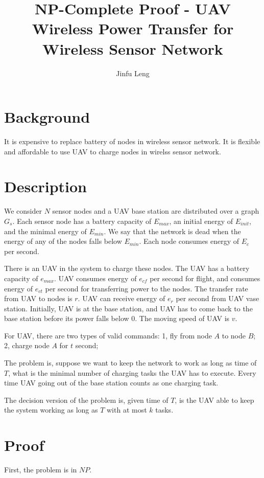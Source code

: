 
\title{NP-Complete Proof - UAV Wireless Power Transfer for Wireless Sensor Network}
\author{Jinfu Leng}
\maketitle
\section{Background}
It is expensive to replace battery of nodes in wireless sensor network.
It is flexible and affordable to use UAV to charge nodes in wirelss sensor network.
\section{Description}
We consider $N$ sensor nodes and a UAV base station are distributed over a graph $G_s$. Each sensor node has a battery capacity of $E_{max}$, an initial energy of $E_{init}$, and the minimal energy of $E_{min}$. We say that the network is dead when the energy of any of the nodes falls below $E_{min}$. Each node consumes energy of $E_{c}$ per second.

There is an UAV in the system to charge these nodes. The UAV has a battery capacity of $e_{max}$. UAV consumes energy of $e_{cf}$ per second for flight, and consumes energy of $e_{ct}$ per second for transferring power to the nodes. The transfer rate from UAV to nodes is $r$. UAV can receive energy of $e_r$ per second from UAV vase station. Initially, UAV is at the base station, and UAV has to come back to the base station before its power falls below $0$. The moving speed of UAV is $v$.

For UAV, there are two types of valid commands:
1, fly from node $A$ to node $B$;
2, charge node $A$ for $t$ second;

The problem is, suppose we want to keep the network to work as long as time of $T$, what is the minimal number of charging tasks the UAV has to execute. Every time UAV going out of the base station counts as one charging task.

The decision version of the problem is, given time of $T$, is the UAV able to keep the system working as long as $T$ with at most $k$ tasks.
\section{Proof}

First, the problem is in $NP$.

